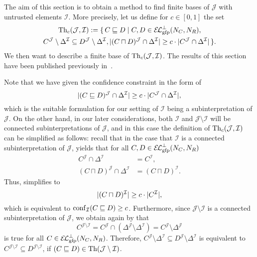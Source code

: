 The aim of this section is to obtain a method to find finite bases of $\mathcal{J}$ with
untrusted elements $\mathcal{I}$.  More precisely, let us define for $c \in [0,1]$ the set
\begin{multline*}
  \operatorname{Th}_{c}(\mathcal{J}, \mathcal{I}) := \{\, C \sqsubseteq D
    \mid C, D \in {\ensuremath{{\mathcal{E}\kern-.3ex\mathcal{L}}_\text{gfp}^\bot}}(N_{C}, N_{R}), \\C^{\mathcal{J}} \setminus \Delta^{\mathcal{I}}
    \subseteq D^{\mathcal{J}} \setminus \Delta^{\mathcal{I}}, \lvert (C \sqcap
      D)^{\mathcal{J}} \cap \Delta^{\mathcal{I}} \rvert \ge c \cdot \lvert C^{\mathcal{J}} \cap
      \Delta^{\mathcal{I}} \rvert \,\}.
\end{multline*}
We then want to describe a finite base of $\operatorname{Th}_{c}(\mathcal{J}, \mathcal{I})$.  The
results of this section have been published previously in~\cite{conf/dlog/Borchmann13}.

Note that we have given the confidence constraint in the form of
\begin{equation}
  \label{eq:50}
  \lvert (C \sqsubseteq D)^{\mathcal{J}} \cap \Delta^{\mathcal{I}} \rvert \ge c \cdot \lvert
    C^{\mathcal{J}} \cap \Delta^{\mathcal{I}} \rvert,
\end{equation}
which is the suitable formulation for our setting of $\mathcal{I}$ being a
subinterpretation of $\mathcal{J}$.  On the other hand, in our later considerations, both
$\mathcal{I}$ and $\mathcal{J} \setminus \mathcal{I}$ will be connected subinterpretations
of $\mathcal{J}$, and in this case the definition of $\operatorname{Th}_{c}(\mathcal{J}, \mathcal{I})$
can be simplified as follows: recall that in the case that $\mathcal{I}$ is a connected
subinterpretation of $\mathcal{J}$,  yields that for all $C, D \in
{\ensuremath{{\mathcal{E}\kern-.3ex\mathcal{L}}_\text{gfp}^\bot}}(N_{C}, N_{R})$
\begin{align*}
  C^{\mathcal{J}} \cap \Delta^{\mathcal{I}} &= C^{\mathcal{I}}, \\
  (C \sqcap D)^{\mathcal{J}} \cap \Delta^{\mathcal{I}} &= (C \sqcap D)^{\mathcal{I}}.
\end{align*}
Thus,  simplifies to
\begin{equation*}
  \lvert (C \sqcap D)^{\mathcal{I}} \rvert \ge c \cdot \lvert C^{\mathcal{I}} \rvert,
\end{equation*}
which is equivalent to $\operatorname{conf}_{\mathcal{I}}( C \sqsubseteq D ) \ge c$.  Furthermore, since
$\mathcal{J} \setminus \mathcal{I}$ is a connected subinterpretation of $\mathcal{J}$, we
obtain again by  that
\begin{equation*}
  C^{\mathcal{J} \setminus \mathcal{I}} = C^{\mathcal{J}} \cap (\Delta^{\mathcal{J}}
  \setminus \Delta^{\mathcal{I}}) = C^{\mathcal{J}} \setminus \Delta^{\mathcal{J}}
\end{equation*}
is true for all $C \in {\ensuremath{{\mathcal{E}\kern-.3ex\mathcal{L}}_\text{gfp}^\bot}}(N_{C}, N_{R})$.  Therefore, $C^{\mathcal{J}} \setminus
\Delta^{\mathcal{I}} \subseteq D^{\mathcal{J}} \setminus \Delta^{\mathcal{I}}$ is
equivalent to $C^{\mathcal{J}\setminus\mathcal{I}} \subseteq
D^{\mathcal{J}\setminus\mathcal{I}}$, \ie if $(C \sqsubseteq D) \in \operatorname{Th}(\mathcal{J}
\setminus \mathcal{I})$.

